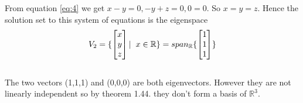 \documentclass[reqno,a4paper,12pt]{amsart}
\newcommand{\R}{\mathbb{R}}
\begin{document}
From equation \eqref{eq:4} we get $x-y=0, -y+z=0, 0=0$. So $x=y=z$. Hence the solution set to this system of equations is the eigenspace\\ 
  \begin{align}
  V_2
  =
  \{
    \begin{bmatrix}
      x \\
      y \\
      z \\
    \end{bmatrix}
    |
    \hspace{0.2cm}x\in\R
  \}
  = 
  span_\R
  \{
  \begin{bmatrix}
  1 \\
  1 \\
  1 \\
  \end{bmatrix}
  \}\label{eq:5}
  \end{align}\\
The two vectors (1,1,1) and (0,0,0) are both eigenvectors. However they are not linearly independent so by theorem 1.44. they don't form a basis of $\R^3$.

     
\end{document}
